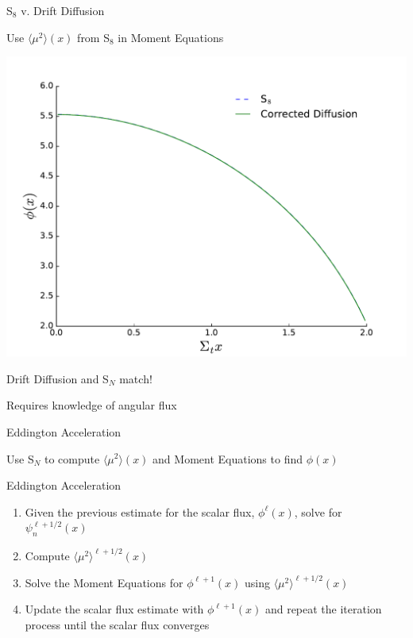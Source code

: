 \documentclass[10pt]{beamer}
\newcommand{\SN}{S$_N$\xspace}
\newcommand{\edd}{\langle \mu^2 \rangle}
\begin{document}
\begin{frame}{S$_8$ v. Drift Diffusion}

    \onslide<+->
	Use $\edd(x)$ from S$_8$ in Moment Equations
	\begin{center}
	\includegraphics[width=.5\paperwidth]{figs/corrected.pdf}
	\end{center}

    \onslide<+->
    Drift Diffusion and \SN match! 

    \onslide<+-> 
    Requires knowledge of angular flux

\end{frame}

\begin{frame}{Eddington Acceleration}

    Use \SN to compute $\edd(x)$ and Moment Equations to find $\phi(x)$ 

    \begin{exampleblock}{Eddington Acceleration}
    \begin{enumerate}
        \item Given the previous estimate for the scalar flux, $\phi^{\ell}(x)$, solve for $\psi_n^{\ell+1/2}(x)$

        \item \alert{Compute $\edd^{\ell+1/2}(x)$ }

        \item \alert{Solve the Moment Equations for $\phi^{\ell+1}(x)$ 
        	using $\edd^{\ell+1/2}(x)$} 

        \item Update the scalar flux estimate with $\phi^{\ell+1}(x)$ and repeat the iteration process until the scalar flux converges
    \end{enumerate}
    \end{exampleblock}

\end{frame}
\end{document}
